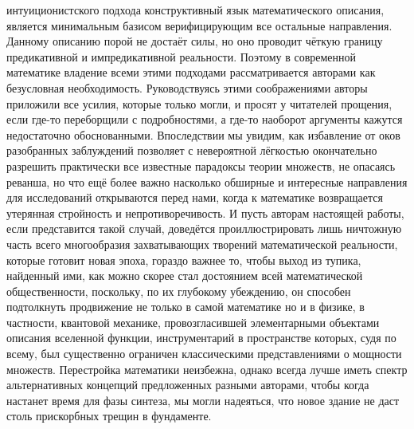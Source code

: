 \documentclass[12pt]{article}
\begin{document}
интуиционистского подхода конструктивный язык математического описания, является минимальным базисом верифицирующим все остальные направления. Данному описанию порой не достаёт силы, но оно проводит чёткую границу предикативной и импредикативной реальности. Поэтому в современной математике владение всеми этими подходами рассматривается авторами как безусловная необходимость. Руководствуясь этими соображениями авторы приложили все усилия, которые только могли, и просят у читателей прощения, если где-то переборщили с подробностями, а где-то наоборот аргументы кажутся недостаточно обоснованными. Впоследствии мы увидим, как избавление от оков разобранных заблуждений позволяет с невероятной лёгкостью окончательно разрешить практически все известные парадоксы теории множеств, не опасаясь реванша, но что ещё более важно насколько обширные и интересные направления для исследований открываются перед нами, когда к математике возвращается утерянная стройность и непротиворечивость. И пусть авторам настоящей работы, если представится такой случай, доведётся проиллюстрировать лишь ничтожную часть всего многообразия захватывающих творений математической реальности, которые готовит новая эпоха, гораздо важнее то, чтобы выход из тупика, найденный ими, как можно скорее стал достоянием всей математической общественности, поскольку, по их глубокому убеждению, он способен подтолкнуть продвижение не только в самой математике но и в физике, в частности, квантовой механике, провозгласившей элементарными объектами описания вселенной функции, инструментарий в пространстве которых, судя по всему, был существенно ограничен классическими представлениями о мощности множеств. Перестройка математики неизбежна, однако всегда лучше иметь спектр альтернативных концепций предложенных разными авторами, чтобы когда настанет время для фазы синтеза, мы могли надеяться, что новое здание не даст столь прискорбных трещин в фундаменте.

\printbibliography

 
\end{document}
